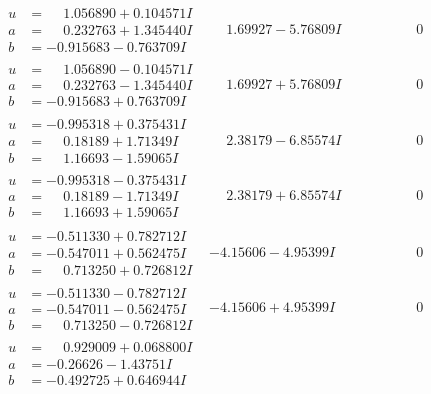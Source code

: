 \documentclass[1p]{elsarticle_modified}
\theoremstyle{definition}
\begin{document}
$$\begin{array}{c|c|c}
\begin{aligned}
u &= \phantom{-}1.056890 + 0.104571 I \\
a &= \phantom{-}0.232763 + 1.345440 I \\
b &= -0.915683 - 0.763709 I\end{aligned}
 & \phantom{-}1.69927 - 5.76809 I & \phantom{-0.000000 } 0 \\ \hline\begin{aligned}
u &= \phantom{-}1.056890 - 0.104571 I \\
a &= \phantom{-}0.232763 - 1.345440 I \\
b &= -0.915683 + 0.763709 I\end{aligned}
 & \phantom{-}1.69927 + 5.76809 I & \phantom{-0.000000 } 0 \\ \hline\begin{aligned}
u &= -0.995318 + 0.375431 I \\
a &= \phantom{-}0.18189 + 1.71349 I \\
b &= \phantom{-}1.16693 - 1.59065 I\end{aligned}
 & \phantom{-}2.38179 - 6.85574 I & \phantom{-0.000000 } 0 \\ \hline\begin{aligned}
u &= -0.995318 - 0.375431 I \\
a &= \phantom{-}0.18189 - 1.71349 I \\
b &= \phantom{-}1.16693 + 1.59065 I\end{aligned}
 & \phantom{-}2.38179 + 6.85574 I & \phantom{-0.000000 } 0 \\ \hline\begin{aligned}
u &= -0.511330 + 0.782712 I \\
a &= -0.547011 + 0.562475 I \\
b &= \phantom{-}0.713250 + 0.726812 I\end{aligned}
 & -4.15606 - 4.95399 I & \phantom{-0.000000 } 0 \\ \hline\begin{aligned}
u &= -0.511330 - 0.782712 I \\
a &= -0.547011 - 0.562475 I \\
b &= \phantom{-}0.713250 - 0.726812 I\end{aligned}
 & -4.15606 + 4.95399 I & \phantom{-0.000000 } 0 \\ \hline\begin{aligned}
u &= \phantom{-}0.929009 + 0.068800 I \\
a &= -0.26626 - 1.43751 I \\
b &= -0.492725 + 0.646944 I\end{aligned}

\end{array}$$
\end{document}
